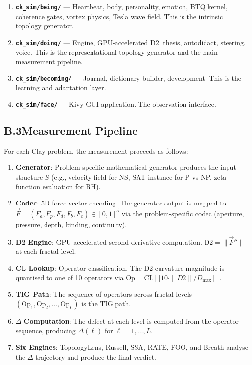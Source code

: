 \documentclass[12pt, openany]{book}
\theoremstyle{remark}
\begin{document}
\begin{enumerate}
  \item \textbf{\texttt{ck\_sim/being/}} --- Heartbeat, body, personality, emotion,
        BTQ kernel, coherence gates, vortex physics, Tesla wave field. This is the
        intrinsic topology generator.
  \item \textbf{\texttt{ck\_sim/doing/}} --- Engine, GPU-accelerated D2, thesis,
        autodidact, steering, voice. This is the representational topology generator
        and the main measurement pipeline.
  \item \textbf{\texttt{ck\_sim/becoming/}} --- Journal, dictionary builder,
        development. This is the learning and adaptation layer.
  \item \textbf{\texttt{ck\_sim/face/}} --- Kivy GUI application. The observation
        interface.
\end{enumerate}

\subsection*{B.3\quad Measurement Pipeline}

For each Clay problem, the measurement proceeds as follows:

\begin{enumerate}
  \item \textbf{Generator}: Problem-specific mathematical generator produces the
        input structure $S$ (e.g., velocity field for NS, SAT instance for P vs NP,
        zeta function evaluation for RH).
  \item \textbf{Codec}: 5D force vector encoding. The generator output is mapped to
        $\vec{F} = (F_a, F_p, F_d, F_b, F_c) \in [0,1]^5$ via the problem-specific
        codec (aperture, pressure, depth, binding, continuity).
  \item \textbf{D2 Engine}: GPU-accelerated second-derivative computation.
        $\mathrm{D2} = \|\vec{F}''\|$ at each fractal level.
  \item \textbf{CL Lookup}: Operator classification. The D2 curvature magnitude is
        quantised to one of 10 operators via
        $\mathrm{Op} = \mathrm{CL}[\lfloor 10 \cdot \|D2\| / D_{\max}\rfloor]$.
  \item \textbf{TIG Path}: The sequence of operators across fractal levels
        $(\mathrm{Op}_1, \mathrm{Op}_2, \ldots, \mathrm{Op}_L)$ is the TIG path.
  \item \textbf{$\Delta$ Computation}: The defect at each level is computed from
        the operator sequence, producing $\Delta(\ell)$ for $\ell = 1, \ldots, L$.
  \item \textbf{Six Engines}: TopologyLens, Russell, SSA, RATE, FOO, and Breath
        analyse the $\Delta$ trajectory and produce the final verdict.
\end{enumerate}
\end{document}
